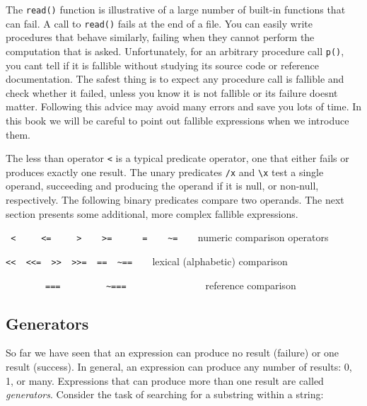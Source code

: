 The \texttt{read()} function is illustrative of a large number of
built-in functions that can fail. A call to \texttt{read()} fails at
the end of a file. You can easily write procedures that behave
similarly, failing when they cannot perform the computation that is
asked. Unfortunately, for an arbitrary procedure call \texttt{p()}, you
can{\textquotesingle}t tell if it is fallible without studying its
source code or reference documentation. The safest
thing is to expect any procedure call is fallible and check whether it
failed, unless you know it is not fallible or its failure
doesn{\textquotesingle}t matter. Following this advice may avoid many
errors and save you lots of time. In this book we will be careful to
point out fallible expressions when we introduce them.

The less than operator \texttt{{\textless}} is a typical predicate
operator, one that either fails or produces exactly one result. The
unary predicates \texttt{/x} and \texttt{{\textbackslash}x} test a single
operand, succeeding and producing the operand if it is null, or
non-null, respectively. The following binary predicates compare two
operands. The next section presents some additional, more complex
fallible expressions.

\bigskip

\texttt{
{\textless} \ \ \ \ {\textless}= \ \ \ \ {\textgreater}
\ \ \ {\textgreater}= \ \ \ \ \ =
\ \ \ \~{}=}\texttt{\ \ }\ \ numeric
comparison operators

\texttt{{\textless}{\textless} \ {\textless}{\textless}=
\ {\textgreater}{\textgreater} \ {\textgreater}{\textgreater}= \ ==
\ \~{}==\ \ }\ \ lexical (alphabetic)
comparison

\ \ \ \ \ \ \ \ \texttt{=== \ \ \ \ \ \ \ \ \~{}===}\ \ \ \ \ \ \ \ \ \ \ \ \ \ \ \ reference comparison

\subsection[Generators]{Generators}

So far we have seen that an expression can produce no result (failure)
or one result (success). In general, an expression can produce any
number of results: 0, 1, or many. Expressions that can produce more
than one result are called \textit{generators}.
Consider the task of searching for a substring within a string:

